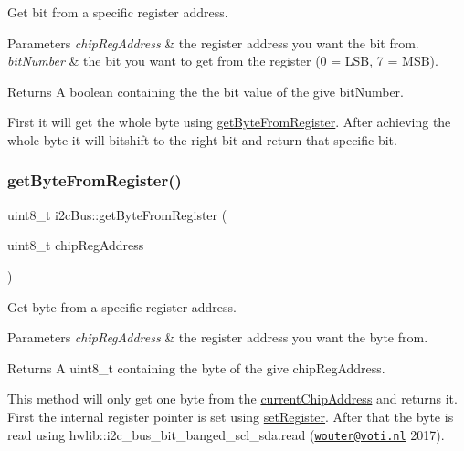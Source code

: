 Get bit from a specific register address. 


\begin{DoxyParams}{Parameters}
{\em chip\+Reg\+Address} & the register address you want the bit from. \\
\hline
{\em bit\+Number} & the bit you want to get from the register (0 = L\+SB, 7 = M\+SB). \\
\hline
\end{DoxyParams}
\begin{DoxyReturn}{Returns}
A boolean containing the the bit value of the give bit\+Number.
\end{DoxyReturn}
First it will get the whole byte using \mbox{\hyperlink{classi2c_bus_a7f83afc0264e758214db63cca336846d}{get\+Byte\+From\+Register}}. After achieving the whole byte it will bitshift to the right bit and return that specific bit. \mbox{\label{classi2c_bus_a7f83afc0264e758214db63cca336846d}} 
\subsubsection{\texorpdfstring{get\+Byte\+From\+Register()}{getByteFromRegister()}}
{\footnotesize\ttfamily uint8\+\_\+t i2c\+Bus\+::get\+Byte\+From\+Register (\begin{DoxyParamCaption}\item[{uint8\+\_\+t}]{chip\+Reg\+Address }\end{DoxyParamCaption})}



Get byte from a specific register address. 


\begin{DoxyParams}{Parameters}
{\em chip\+Reg\+Address} & the register address you want the byte from. \\
\hline
\end{DoxyParams}
\begin{DoxyReturn}{Returns}
A uint8\+\_\+t containing the byte of the give chip\+Reg\+Address.
\end{DoxyReturn}
This method will only get one byte from the \mbox{\hyperlink{classi2c_bus_a64ff87527c88619d72ede947d73eac3a}{current\+Chip\+Address}} and returns it. First the internal register pointer is set using \mbox{\hyperlink{classi2c_bus_adee2545c8b692474b6814b4605e48ec3}{set\+Register}}. After that the byte is read using hwlib\+::i2c\+\_\+bus\+\_\+bit\+\_\+banged\+\_\+scl\+\_\+sda.\+read (\href{mailto:wouter@voti.nl}{\tt wouter@voti.\+nl} 2017). \mbox{\label{classi2c_bus_aba70817c7bc0a9ad73b369616a864395}} 
